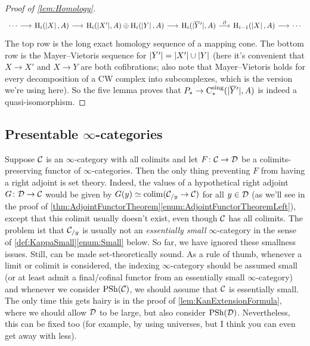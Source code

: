 \begin{proof}[Proof of \cref{lem:Homology}]
\begin{equation*}
\begin{tikzcd}[column sep=1.5em]
			\dotsb \rar & \H_i\lef(\left|X\right|,A\righ)\rar & \H_i\lef(\mathopen|X'\mathclose|,A\righ)\oplus \H_i\lef(\left|Y\right|,A\righ)\rar & \H_i\lef(\mathopen|\ov Y'\mathclose|,A\righ)\rar["\partial"] & \H_{i-1}\lef(\left|X\right|,A\righ)\rar &\dotsb
		\end{tikzcd}
	\end{equation*}
	The top row is the long exact homology sequence of a mapping cone. The bottom row is the Mayer--Vietoris sequence for $\mathopen|\ov Y'\mathclose|=\left|X'\right|\cup\left|Y\right|$ (here it's convenient that $X\rightarrow X'$ and $X\rightarrow Y$ are both cofibrations; also note that Mayer--Vietoris holds for every decomposition of a CW complex into subcomplexes, which is the version we're using here). So the five lemma proves that $P_*\rightarrow \C_*^\mathrm{sing}\lef(\mathopen|\ov Y'\mathclose|,A\righ)$ is indeed a quasi-isomorphism.
\end{proof}

\subsection{Presentable \texorpdfstring{$\infty$}{Infinity}-categories}\label{subsec:Presentable}
Suppose $\mathcal{C}$ is an $\infty$-category with all colimits and let $F\colon \mathcal{C}\rightarrow\mathcal{D}$ be a colimits-preserving functor of $\infty$-categories. Then the only thing preventing $F$ from having a right adjoint is set theory. Indeed, the values of a hypothetical right adjoint $G\colon \mathcal{D}\rightarrow\mathcal{C}$ would be given by $G(y)\simeq \operatorname*{colim}(\mathcal{C}_{/y}\rightarrow \mathcal{C})$ for all $y\in\mathcal{D}$ (as we'll see in the proof of \cref{thm:AdjointFunctorTheorem}\cref{enum:AdjointFunctorTheoremLeft}), except that this colimit usually doesn't exist, even though $\mathcal{C}$ has all colimits. The problem ist that $\mathcal{C}_{/y}$ is usually not an \emph{essentially small} $\infty$-category in the sense of \cref{def:KappaSmall}\cref{enum:Small} below. So far, we have ignored these smallness issues. Still,  can be made set-theoretically sound. As a rule of thumb, whenever a limit or colimit is considered, the indexing $\infty$-category should be assumed small (or at least admit a final/cofinal functor from an essentially small $\infty$-category) and whenever we consider $\operatorname{PSh}(\mathcal{C})$, we should assume that $\mathcal{C}$ is essentially small. The only time this gets hairy is in the proof of \cref{lem:KanExtensionFormula}, where we should allow $\mathcal{D}$ to be large, but also consider $\operatorname{PSh}(\mathcal{D})$. Nevertheless, this can be fixed too (for example, by using universes, but I think you can even get away with less).

